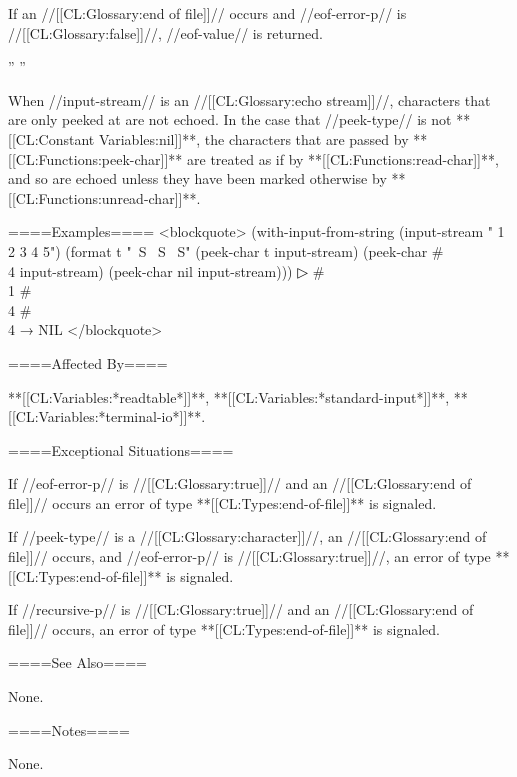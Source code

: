 If an //[[CL:Glossary:end of file]]// occurs and //eof-error-p// is //[[CL:Glossary:false]]//, //eof-value// is returned.

{'' ''}{\ExplainRecursiveP}

When //input-stream// is an //[[CL:Glossary:echo stream]]//, characters that are only peeked at are not echoed. In the case that //peek-type// is not **[[CL:Constant Variables:nil]]**, the characters that are passed by **[[CL:Functions:peek-char]]** are treated as if by **[[CL:Functions:read-char]]**, and so are echoed unless they have been marked otherwise by **[[CL:Functions:unread-char]]**.

====Examples==== <blockquote> (with-input-from-string (input-stream " 1 2 3 4 5") (format t "~S ~S ~S" (peek-char t input-stream) (peek-char #\\4 input-stream) (peek-char nil input-stream)))
▷ #\\1 #\\4 #\\4 → NIL </blockquote>

====Affected By====

**[[CL:Variables:*readtable*]]**, **[[CL:Variables:*standard-input*]]**, **[[CL:Variables:*terminal-io*]]**.

====Exceptional Situations====

If //eof-error-p// is //[[CL:Glossary:true]]// and an //[[CL:Glossary:end of file]]// occurs an error of type **[[CL:Types:end-of-file]]** is signaled.

If //peek-type// is a //[[CL:Glossary:character]]//, an //[[CL:Glossary:end of file]]// occurs, and //eof-error-p// is //[[CL:Glossary:true]]//, an error of type **[[CL:Types:end-of-file]]** is signaled.

If //recursive-p// is //[[CL:Glossary:true]]// and an //[[CL:Glossary:end of file]]// occurs, an error of type **[[CL:Types:end-of-file]]** is signaled.

====See Also====

None.

====Notes====

None.

 
